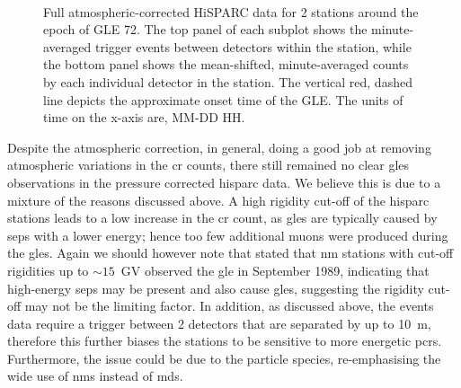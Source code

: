 \begin{figure}[ht!]
	\centering
	 \\
	
	
	\caption{Full atmospheric-corrected HiSPARC data for 2 stations around the epoch of GLE 72. The top panel of each subplot shows the minute-averaged trigger events between detectors within the station, while the bottom panel shows the mean-shifted, minute-averaged counts by each individual detector in the station. The vertical red, dashed line depicts the approximate onset time of the GLE. The units of time on the x-axis are, MM-DD HH.}
	\label{fig:GLE_72_Pcorr}
\end{figure}

Despite the atmospheric correction, in general, doing a good job at removing atmospheric variations in the \gls{cr} counts, there still remained no clear \glspl{gle} observations in the pressure corrected \gls{hisparc} data. We believe this is due to a mixture of the reasons discussed above. A high rigidity cut-off of the \gls{hisparc} stations leads to a low increase in the \gls{cr} count, as \glspl{gle} are typically caused by \glspl{sep} with a lower energy; hence too few additional muons were produced during the \glspl{gle}. Again we should however note that \citet{humble_j._e._detection_2012} stated that \gls{nm} stations with cut-off rigidities up to $\sim 15$~GV observed the \gls{gle} in September 1989, indicating that high-energy \glspl{sep} may be present and also cause \glspl{gle}, suggesting the rigidity cut-off may not be the limiting factor. In addition, as discussed above, the events data require a trigger between 2 detectors that are separated by up to 10~m, therefore this further biases the stations to be sensitive to more energetic \glspl{pcr}. Furthermore, the issue could be due to the particle species, re-emphasising the wide use of \glspl{nm} instead of \glspl{md}.

